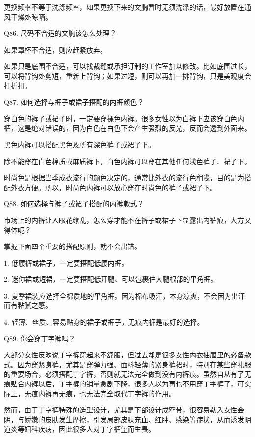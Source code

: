 \documentclass[12pt,UTF8]{ctexbook}
\begin{document}
更换频率不等于洗涤频率，如果更换下来的文胸暂时无须洗涤的话，最好放置在通风干燥处晾晒。





Q86. 尺码不合适的文胸该怎么处理？


如果罩杯不合适，则应赶紧放弃。

如果只是底围不合适，可以找裁缝或承担订制的工作室加以修改。比如底围过长，可以将背钩处剪短，重新上背钩；如果过短，则可以再加一排背钩，只是美观度会打折扣。





Q87. 如何选择与裤子或裙子搭配的内裤颜色？


穿白色的裤子或裙子时，一定要穿裸色内裤。很多女性以为白裤下应该穿白色内裤，这是绝对错误的，因为白色在白色下会产生强烈的反光，反而会透到外面来。

黑色内裤可以搭配黑色及所有深色裤子或裙子下。

除不能穿在白色棉质或麻质裤下，白色内裤可以穿在其他任何浅色裤子、裙子下。

时尚色是根据当季成衣流行的颜色决定的，通常比外衣的流行色稍浅，目的是为搭配外衣方便。所以，时尚色内裤可以放心穿在时尚色的裤子或裙子下。





Q88. 如何选择与裤子或裙子搭配的内裤款式？


市场上的内裤让人眼花缭乱，怎么穿才能不在裤子或裙子下显露出内裤痕，大方又得体呢？


掌握下面四个重要的搭配原则，就不会出错。

1. 低腰裤或裙子，一定要搭配低腰内裤。

2. 迷你裙或短裙，一定要搭配低开腿、可以包裹住大腿根部的平角裤。

3. 夏季裙装应选择全棉质地的平角裤。因为棉布吸汗，本身凉爽，不会因为出汗而有粘腻之感。

4. 轻薄、丝质、容易贴身的裙子或裤子，无痕内裤是最好的选择。





Q89. 你会穿丁字裤吗？


大部分女性反映说丁字裤穿起来不舒服，但过去却是很多女性内衣抽屉里的必备款式。因为穿紧身裤，尤其是穿弹力强、面料轻薄的紧身裤裙时，特别在某些穿礼服的重要场合，必须搭配丁字裤，否则就无法完全做到没有内裤痕。虽然自从有了无痕贴合内裤以后，丁字裤的销量急剧下降，很多人以为再也不用穿丁字裤了，可实际上，无痕内裤再无痕，也无法完全取代丁字裤的作用。

然而，由于丁字裤特殊的造型设计，尤其是下部设计成窄带，很容易勒入女性会阴，与娇嫩的皮肤发生摩擦，引发局部皮肤充血、红肿、感染等症状，从而诱发阴道炎等妇科疾病，因此很多人对丁字裤望而生畏。
\end{document}
